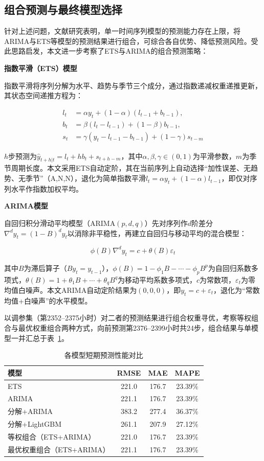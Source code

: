 \documentclass{ctexart}
\begin{document}
\subsection{组合预测与最终模型选择}
针对上述问题，文献研究表明，单一时间序列模型的预测能力存在上限，将ARIMA与ETS等模型的预测结果进行组合，可综合各自优势、降低预测风险\cite{wang2025}。受此思路启发，本文进一步考察了ETS与ARIMA的组合预测策略：

\textbf{指数平滑（ETS）模型}

指数平滑将序列分解为水平、趋势与季节三个成分，通过指数递减权重递推更新，其状态空间递推方程为：

\begin{align}
l_t&=\alpha y_t+(1-\alpha)(l_{t-1}+b_{t-1}),\\
b_t&=\beta(l_t-l_{t-1})+(1-\beta)b_{t-1},\\
s_t&=\gamma(y_t-l_{t-1}-b_{t-1})+(1-\gamma)s_{t-m}
\end{align}

$h$步预测为$\hat y_{t+h|t}=l_t+hb_t+s_{t+h-m}$，其中$\alpha,\beta,\gamma\in(0,1)$为平滑参数，$m$为季节周期长度。本文采用ETS自动定阶，其在当前序列上自动选择“加性误差、无趋势、无季节”（A,N,N），退化为简单指数平滑$l_t=\alpha y_t+(1-\alpha)l_{t-1}$，即仅对序列水平作指数加权平均。

\textbf{ARIMA模型}

自回归积分滑动平均模型（ARIMA$(p,d,q)$）先对序列作$d$阶差分$\nabla^dy_t=(1-B)^dy_t$以消除非平稳性，再建立自回归与移动平均的混合模型：

\[
\phi(B)\nabla^dy_t=c+\theta(B)\varepsilon_t
\]

其中$B$为滞后算子（$By_t=y_{t-1}$），$\phi(B)=1-\phi_1B-\cdots-\phi_pB^p$为自回归系数多项式，$\theta(B)=1+\theta_1B+\cdots+\theta_qB^q$为移动平均系数多项式，$c$为常数项，$\varepsilon_t$为零均值白噪声。本文ARIMA自动定阶结果为$(0,0,0)$，即$y_t=c+\varepsilon_t$，退化为“常数均值+白噪声”的水平模型。

以调参集（第2352–2375小时）对二者的预测结果进行组合权重寻优，考察等权组合与最优权重组合两种方式，向前预测第2376–2399小时共24步，组合结果与单模型一并汇总于表~\ref{tab:model_cmp}。

\begin{table}[H]
	\centering
	\caption{各模型短期预测性能对比}
	\label{tab:model_cmp}
	\begin{tabular}{lccc}
		\toprule
		模型&RMSE&MAE&MAPE\\
		\midrule
		ETS&221.0&176.7&23.39\%\\
		ARIMA&221.1&176.7&23.39\%\\
		分解+ARIMA&383.2&277.4&36.37\%\\
		分解+LightGBM&261.1&207.9&27.12\%\\
		等权组合（ETS+ARIMA）&221.0&176.7&23.39\%\\
		最优权重组合（ETS+ARIMA）&221.1&176.7&23.39\%\\
		\bottomrule
	\end{tabular}
\end{table}
\end{document}
